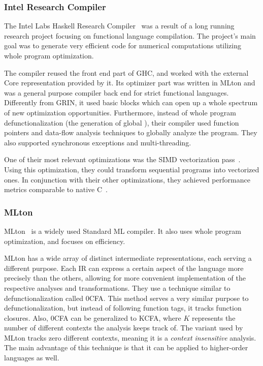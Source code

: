 \documentclass[main.tex]{subfiles}
\begin{document}
	\subsubsection{Intel Research Compiler}
	
	The Intel Labs Haskell Research Compiler~\cite{hrc} was a result of a long running research project focusing on functional language compilation. The project's main goal was to generate very efficient code for numerical computations utilizing whole program optimization.
	
	The compiler reused the front end part of GHC, and worked with the external Core representation provided by it. Its optimizer part was written in MLton and was a general purpose compiler back end for strict functional languages. Differently from GRIN, it used basic blocks which can open up a whole spectrum of new optimization opportunities. Furthermore, instead of whole program defunctionalization (the generation of global ), their compiler used function pointers and data-flow analysis techniques to globally analyze the program. They also supported synchronous exceptions and multi-threading.
	
	One of their most relevant optimizations was the SIMD vectorization pass~\cite{hrc-simd}. Using this optimization, they could transform sequential programs into vectorized ones. In conjunction with their other optimizations, they achieved performance metrics comparable to native C~\cite{haskell-gap}.
	
	\subsubsection{MLton}
	
	MLton~\cite{mlton} is a widely used Standard ML compiler. It also uses whole program optimization, and focuses on efficiency.
	
	MLton has a wide array of distinct intermediate representations, each serving a different purpose. Each IR can express a certain aspect of the language more precisely than the others, allowing for more convenient implementation of the respective analyses and transformations. They use a technique similar to defunctionalization called 0CFA. This method serves a very similar purpose to defunctionalization, but instead of following function tags, it tracks function closures. Also, 0CFA can be generalized to KCFA, where $K$ represents the number of different contexts the analysis keeps track of. The variant used by MLton tracks zero different contexts, meaning it is a \textit{context insensitive} analysis. The main advantage of this technique is that it can be applied to higher-order languages as well. 
	
\end{document}
